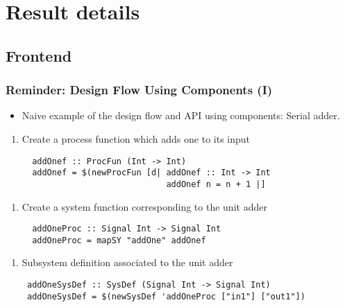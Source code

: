 \documentclass{beamer}
\begin{document}
\section{Result details}

\beamerdefaultoverlayspecification{<+->}



\subsection{Frontend}

\begin{frame}[fragile]
  \frametitle{Reminder: Design Flow Using Components (I)}
  \begin{itemize}
  \item
    Naive example of the design flow and API using components: Serial adder.
  \end{itemize}
  
  
  \vspace{-0.7cm}
  \begin{overprint}
   \begin{enumerate}[1)]
   \item Create a process function which adds one to its input 
    \begin{lstlisting}
  addOnef :: ProcFun (Int -> Int)
  addOnef = $(newProcFun [d| addOnef :: Int -> Int 
                             addOnef n = n + 1 |]
    \end{lstlisting}
    \end{enumerate}
   
   \begin{enumerate}[2)]
   \item Create a system function corresponding to the unit adder
   \begin{lstlisting}
  addOneProc :: Signal Int -> Signal Int
  addOneProc = mapSY "addOne" addOnef
   \end{lstlisting}
   \end{enumerate}
   
   \begin{enumerate}[3)]
   \item Subsystem definition associated to the unit adder
   \begin{lstlisting}
 addOneSysDef :: SysDef (Signal Int -> Signal Int)
 addOneSysDef = $(newSysDef 'addOneProc ["in1"] ["out1"])
   \end{lstlisting}
   \end{enumerate}



\end{overprint}
\end{frame}
\end{document}

